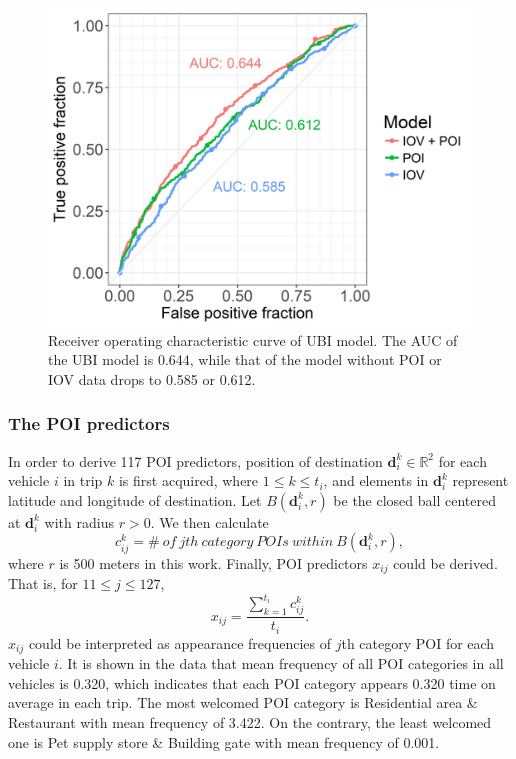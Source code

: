 \documentclass[sii]{ipart}
\theoremstyle{plain}
\begin{document}
\begin{figure}[h!]
	\centering
	\includegraphics[width=0.937\linewidth]{ROC}
	\small\caption[]{Receiver operating characteristic curve of UBI model. The AUC of the UBI model is 0.644, while that of the model without POI or IOV data drops to 0.585 or 0.612.}
	\label{fig:ROC}
\end{figure}

\subsubsection{The POI predictors}
In order to derive 117 POI predictors, position of destination $\mathbf{d}_i^k \in \mathbb{R}^2$ for each vehicle $i$ in trip $k$ is first acquired, where $1 \leq k \leq t_i$, and elements in $\mathbf{d}_i^k$ represent latitude and longitude of destination. Let $B(\mathbf{d}_i^k , r)$ be the closed ball centered at $\mathbf{d}_i^k$ with radius $r > 0$. We then calculate
$$c_{ij}^k = \# \ of \ jth\ category \ POIs \ within \ B(\mathbf{d}_i^k , r),$$
where $r$ is 500 meters in this work. Finally, POI predictors $x_{ij}$ could be derived. That is, for $11 \leq j \leq 127$,
$$x_{ij}=\frac{\sum_{k=1}^{t_i} c_{ij}^k}{t_i}.$$
$x_{ij}$ could be interpreted as appearance frequencies of $j$th category POI for each vehicle $i$. It is shown in the data that mean frequency of all POI categories in all vehicles is 0.320, which indicates that each POI category appears 0.320 time on average in each trip. The most welcomed POI category is Residential area \& Restaurant with mean frequency of 3.422. On the contrary, the least welcomed one is Pet supply store \& Building gate with mean frequency of 0.001.
\end{document}
